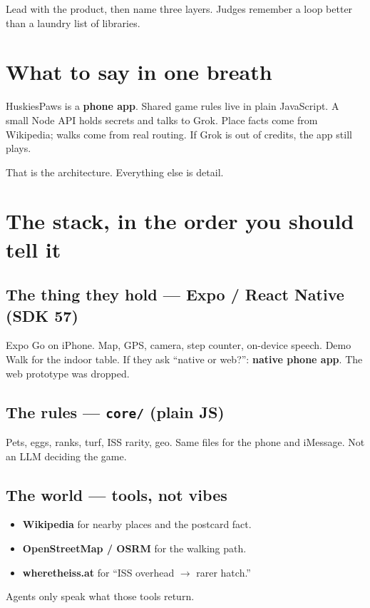 \documentclass[11pt]{article}
\begin{document}

Lead with the product, then name three layers. Judges remember a loop better than a
laundry list of libraries.

\section{What to say in one breath}
HuskiesPaws is a \textbf{phone app}. Shared game rules live in plain JavaScript.
A small Node API holds secrets and talks to Grok. Place facts come from Wikipedia;
walks come from real routing. If Grok is out of credits, the app still plays.

That is the architecture. Everything else is detail.

\section{The stack, in the order you should tell it}

\subsection{The thing they hold --- Expo / React Native (SDK 57)}
Expo Go on iPhone. Map, GPS, camera, step counter, on-device speech. Demo Walk for
the indoor table. If they ask ``native or web?'': \textbf{native phone app}. The web
prototype was dropped.

\subsection{The rules --- \texttt{core/} (plain JS)}
Pets, eggs, ranks, turf, ISS rarity, geo. Same files for the phone and iMessage.
Not an LLM deciding the game.

\subsection{The world --- tools, not vibes}
\begin{itemize}
  \item \textbf{Wikipedia} for nearby places and the postcard fact.
  \item \textbf{OpenStreetMap / OSRM} for the walking path.
  \item \textbf{wheretheiss.at} for ``ISS overhead $\rightarrow$ rarer hatch.''
\end{itemize}
Agents only speak what those tools return.
\end{document}
